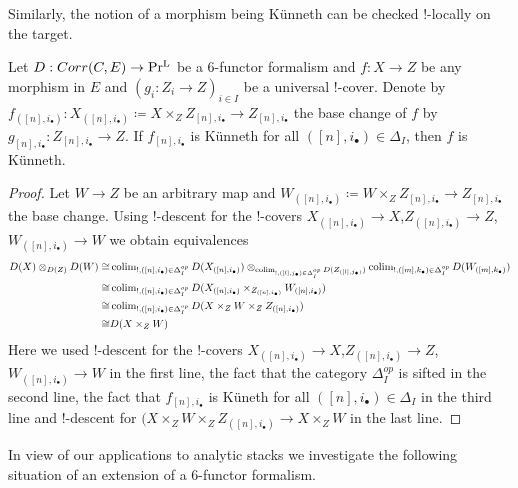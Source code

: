Similarly, the notion of a morphism being Künneth can be checked $!$-locally on the target. 
\begin{proposition}
    
\label{dualisability is !-local on target}
 Let $D : Corr(C,E) \to \operatorname{Pr^{L}}$ be a $6$-functor formalism and $f: X \to Z$ be any morphism in $E$ and $(g_i: Z_i\to Z)_{i\in I}$ be a universal $!$-cover. Denote by  $f_{([n],i_\bullet)}: X_{([n],i_\bullet)}\coloneqq X \times_Z Z_{[n],i_\bullet} \to Z_{[n],i_\bullet}$ the base change of $f$ by $g_{[n],i_\bullet}: Z_{[n],i_\bullet} \to Z$. If $f_{[n],i_\bullet}$ is Künneth for all $([n],i_\bullet)\in \Delta_I$, then $f$ is Künneth.
\end{proposition}
\begin{proof}
Let $W \to Z$ be an arbitrary map and $W_{([n],i_\bullet)}\coloneqq W \times_Z Z_{[n],i_\bullet} \to Z_{[n],i_\bullet}$ the base change. Using $!$-descent for  the $!$-covers $X_{([n],i_\bullet)}\to X$,$Z_{([n],i_\bullet)}\to Z$, $W_{([n],i_\bullet)}\to W$ we obtain equivalences 
\begin{align*}
    D(X)\otimes_{D(Z)}D(W) \cong &\operatorname{colim}_{!,([n],i_\bullet)\in \Delta_I^{op}}D(X_{([n],i_\bullet)}) \otimes_{\operatorname{colim}_{!,([l],j_\bullet)\in \Delta_I^{op}}D(Z_{([l],j_\bullet)})}\operatorname{colim}_{!,([m],k_\bullet)\in \Delta_I^{op}}D(W_{([m],k_\bullet)}) \\
    \cong & \operatorname{colim}_{!,([n],i_\bullet)\in \Delta_I^{op}}D(X_{([n],i_\bullet)}\times_{Z_{([n],i_\bullet)}} W_{([n],i_\bullet)}) \\
    \cong & \operatorname{colim}_{!,([n],i_\bullet)\in \Delta_I^{op}}D(X\times_Z W \times_Z Z_{([n],i_\bullet)}) \\
    \cong & D(X\times_Z W)
\end{align*}
Here we used $!$-descent for the $!$-covers $X_{([n],i_\bullet)}\to X$,$Z_{([n],i_\bullet)}\to Z$, $W_{([n],i_\bullet)}\to W$ in the first line, the fact that  the category $\Delta_I^{op}$ is sifted in the second line, the fact that $f_{[n],i_\bullet}$ is Küneth for all $([n],i_\bullet)\in \Delta_I$ in the third line and  $!$-descent for $(X\times_Z W \times_Z Z_{([n],i_\bullet)} \to X\times_Z W$ in the last line.
\end{proof}
 In view of our applications to analytic stacks we investigate the following situation of an extension of a $6$-functor formalism.
